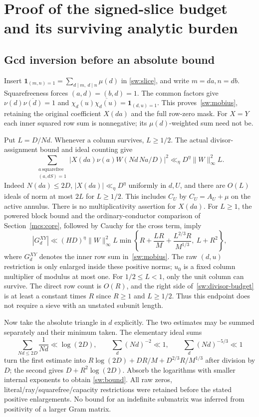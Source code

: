 \documentclass[11pt]{article}
\theoremstyle{definition}\newtheorem{definition}[theorem]{Definition}
\theoremstyle{remark}\newtheorem{remark}[theorem]{Remark}
\begin{document}
\section{Proof of the signed-slice budget and its surviving analytic burden}\label{sw:details}
\subsection{Gcd inversion before an absolute bound}
Insert $\mathbf1_{(m,n)=1}=\sum_{d\mid m,\ d\mid n}\mu(d)$ in
\eqref{sw:slice}, and write $m=da,n=db$. Squarefreeness forces
$(a,d)=(b,d)=1$. The common factors give
$\nu(d)\overline{\nu(d)}=1$ and
$\chi_d(u)\overline{\chi_d(u)}=\mathbf1_{(d,u)=1}$.
This proves~\eqref{sw:mobius}, retaining the original coefficient
$X(da)$ and the full row-zero mask. For $X=Y$ each inner squared row sum
is nonnegative; its $\mu(d)$-weighted sum need not be.

Put $L=D/Nd$. Whenever a column survives, $L\ge1/2$.
The actual divisor-assignment bound and ideal counting give
\[
 \sum_{\substack{a\ \mathrm{squarefree}\\(a,dS)=1}}
 |X(da)\nu(a)W(Nd\,Na/D)|^2
       \ll_\eta D^\eta\|W\|_\infty^2 L.
\]
Indeed $N(da)\le2D$, $|X(da)|\ll_\eta D^\eta$ uniformly in $d,U$,
and there are $O(L)$ ideals of norm at most $2L$ for $L\ge1/2$.
This includes $C_U$ by $C_U=A_U+\mu$ on the active annulus.
There is no multiplicativity assertion for $X(da)$.
For $L\ge1$, the powered block bound and the ordinary-conductor comparison
of Section~\ref{mcs:core}, followed by Cauchy for the cross term, imply
\begin{equation}\label{sw:divisor-budget}
 |G_d^{XY}|\ll (HD)^\eta\|W\|_\infty^2 L
 \min\left\{R+\frac{LR}{M}+\frac{L^{2/3}R}{M^{1/3}},\ L+R^2\right\},
\end{equation}
where $G_d^{XY}$ denotes the inner row sum in~\eqref{sw:mobius}.
The raw $(d,u)$ restriction is only enlarged inside these positive norms;
$u_0$ is a fixed column multiplier of modulus at most one.
For $1/2\le L<1$, only the unit column can survive. The direct row count
is $O(R)$, and the right side of~\eqref{sw:divisor-budget} is at least a
constant times $R$ since $R\ge1$ and $L\ge1/2$.
Thus this endpoint does not require a sieve with an unstated subunit length.

Now take the absolute triangle in $d$ explicitly. The two estimates may
be summed separately and their minimum taken. The elementary ideal sums
\[
 \sum_{Nd\le2D}\frac1{Nd}\ll\log(2D),\qquad
 \sum_d(Nd)^{-2}\ll1,\qquad \sum_d(Nd)^{-5/3}\ll1
\]
turn the first estimate into
$R\log(2D)+DR/M+D^{2/3}R/M^{1/3}$ after division by $D$;
the second gives $D+R^2\log(2D)$.
Absorb the logarithms with smaller internal exponents to obtain
\eqref{sw:bound}. All raw zeros, literal/ray/squarefree/capacity restrictions
were retained before the stated positive enlargements. No bound for an
indefinite submatrix was inferred from positivity of a larger Gram matrix.
\end{document}
